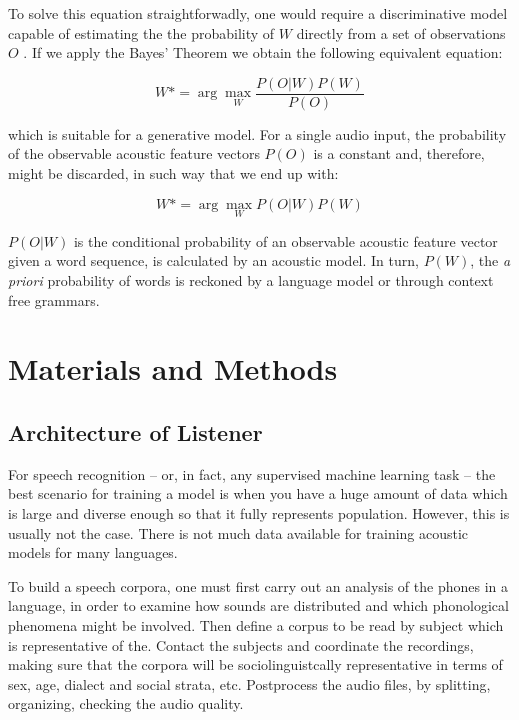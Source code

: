 \documentclass[twocolumn]{bmcart}%
\begin{document}
To solve this equation straightforwadly, one would require a discriminative model
capable of estimating the the probability of $W$ directly from a set of observations $O$ \cite{Gales2008}.
If we apply the Bayes' Theorem we obtain the following equivalent equation:

\begin{equation}
W*= \arg\max_{W}\frac{P(O|W)P(W)}{P(O)}
\end{equation}

which is suitable for a generative model. For a single audio input, the probability of the observable acoustic feature vectors $P(O)$ is a constant and, therefore, might be discarded, in such way that we end up with:

\begin{equation}
W*= \arg\max_{W}P(O|W)P(W)
\end{equation}

$P(O|W)$ is the conditional probability of an observable acoustic feature vector given a word sequence, is calculated by an acoustic model. In turn, $P(W)$, the \emph{a priori} probability of words is reckoned by a language model or through context free grammars.

\section*{Materials and Methods}

\subsection*{\textbf{Architecture of Listener}}

For speech recognition -- or, in fact, any supervised  machine learning task -- the best
scenario for training a model is when you have a huge amount of data which is large and
diverse enough so that it fully represents population. However, this is usually not the case. 
There is not much data available for training acoustic models for many languages.

To build a speech corpora, one must first carry out an analysis of the phones in a language, in order to examine how sounds are distributed and which phonological phenomena might be involved. Then define a corpus to be read by subject which is representative of the. Contact the subjects and coordinate the recordings, making sure that the corpora will be sociolinguistcally representative in terms of sex, age, dialect and social strata, etc. Postprocess the audio files, by splitting, organizing, checking the audio quality.
\end{document}
